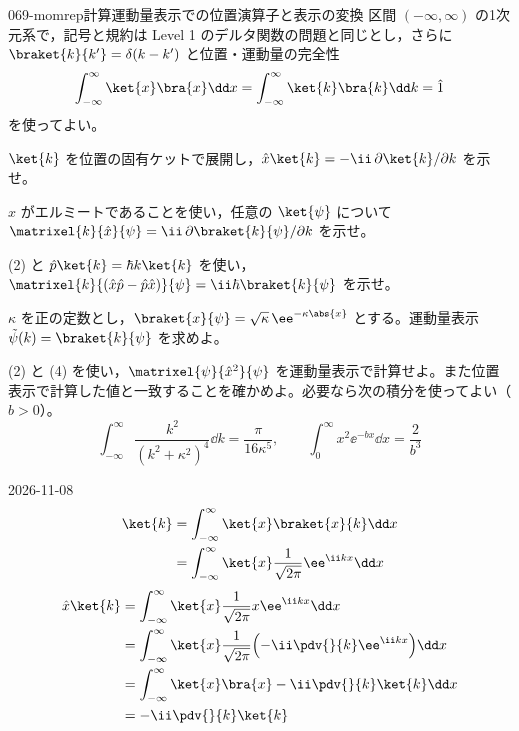 \documentclass[uplatex,dvipdfmx,a4paper,11pt]{jsarticle}
\begin{document}
\begin{mondai}{069-momrep}{計算}{運動量表示での位置演算子と表示の変換}
区間 $(-\infty,\infty)$ の1次元系で，記号と規約は Level 1 のデルタ関数の問題と同じとし，さらに $\braket{k}{k'}=\delta(k-k')$ と位置・運動量の完全性
  \[ \int_{-\infty}^{\infty}\ket{x}\bra{x}\dd x=\int_{-\infty}^{\infty}\ket{k}\bra{k}\dd k=\hat{1} \]
  を使ってよい。
  \begin{shoumon}
    \item $\ket{k}$ を位置の固有ケットで展開し，$\hat{x}\ket{k}=-\ii\,\partial\ket{k}/\partial k$ を示せ。
    \item $\hat{x}$ がエルミートであることを使い，任意の $\ket{\psi}$ について $\matrixel{k}{\hat{x}}{\psi}=\ii\,\partial\braket{k}{\psi}/\partial k$ を示せ。
    \item (2) と $\hat{p}\ket{k}=\hbar k\ket{k}$ を使い，$\matrixel{k}{(\hat{x}\hat{p}-\hat{p}\hat{x})}{\psi}=\ii\hbar\braket{k}{\psi}$ を示せ。
    \item $\kappa$ を正の定数とし，$\braket{x}{\psi}=\sqrt{\kappa}\,\ee^{-\kappa\abs{x}}$ とする。運動量表示 $\tilde{\psi}(k)=\braket{k}{\psi}$ を求めよ。
    \item (2) と (4) を使い，$\matrixel{\psi}{\hat{x}^{2}}{\psi}$ を運動量表示で計算せよ。また位置表示で計算した値と一致することを確かめよ。必要なら次の積分を使ってよい（$b>0$）。
    \[ \int_{-\infty}^{\infty}\frac{k^{2}}{(k^{2}+\kappa^{2})^{4}}\dd k=\frac{\pi}{16\kappa^{5}},\qquad \int_{0}^{\infty}x^{2}\ee^{-bx}\dd x=\frac{2}{b^{3}} \]
  \end{shoumon}
\begin{kotaeutsushi}{2026-11-08}
\begin{align*}
\ket{k}&=\int_{-\infty}^{\infty}\ket{x}\braket{x}{k}\dd x\\
&=\int_{-\infty}^{\infty}\ket{x}\frac{1}{\sqrt{2\pi}}\ee^{\ii kx}\dd x
\end{align*}
\begin{align*}
\hat{x}\ket{k}&=\int_{-\infty}^{\infty}\ket{x}\frac{1}{\sqrt{2\pi}}x\ee^{\ii kx}\dd x\\
&=\int_{-\infty}^{\infty}\ket{x}\frac{1}{\sqrt{2\pi}}\Bigl(-\ii\pdv{}{k}\ee^{\ii kx}\Bigr)\dd x\\
&=\int_{-\infty}^{\infty}\ket{x}\bra{x}-\ii\pdv{}{k}\ket{k}\dd x\\
&=-\ii\pdv{}{k}\ket{k}
\end{align*}
\begin{align*}

\end{align*}
\end{kotaeutsushi}
\end{mondai}
\end{document}
